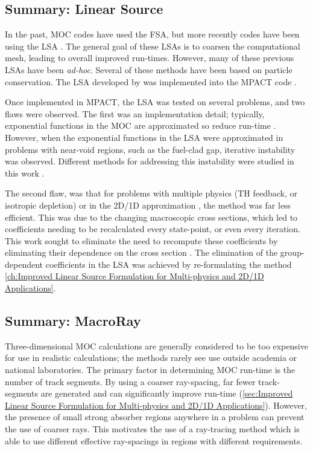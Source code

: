{{    \subsection{Summary: Linear Source}{\label{ssec:Summary:Linear Source}
      In the past, \acf{MOC} codes have used the \acf{FSA}, but more recently codes have been using the \acf{LSA} \cite{Halsall1993,Petkov1999,Santandrea2002,Tang2009,Rabiti2009,Hebert2016,Ferrer2016,Gunow2018}.
      The general goal of these \acp{LSA} is to coarsen the computational mesh, leading to overall improved run-times.
      However, many of these previous \acp{LSA} have been \emph{ad-hoc}.
      Several of these methods \cite{Santandrea2002,Hebert2016,Ferrer2016} have been based on particle conservation.
      The \ac{LSA} developed by \citet{Ferrer2016} was implemented into the MPACT code \cite{Fitzgerald2018,Fitzgerald2019}.

      Once implemented in MPACT, the \ac{LSA} was tested on several problems, and two flaws were observed.
      The first was an implementation detail; typically, exponential functions in the \ac{MOC} are approximated so reduce run-time \cite{Yamamoto2004}.
      However, when the exponential functions in the \ac{LSA} were approximated in problems with near-void regions, such as the fuel-clad gap, iterative instability was observed.
      Different methods for addressing this instability were studied in this work \cite{Fitzgerald2018}.

      The second flaw, was that for problems with multiple physics (\acf{TH} feedback, or isotropic depletion) or in the 2D/1D approximation \cite{Collins2016}, the method was far less efficient.
      This was due to the changing macroscopic cross sections, which led to coefficients needing to be recalculated every state-point, or even every iteration.
      This work sought to eliminate the need to recompute these coefficients by eliminating their dependence on the cross section \cite{Fitzgerald2019}.
      The elimination of the group-dependent coefficients in the \ac{LSA} was achieved by re-formulating the method \cref{ch:Improved Linear Source Formulation for Multi-physics and 2D/1D Applications}.
    }

    \subsection{Summary: MacroRay}{\label{ssec:Summary:MacroRay}
      Three-dimensional \ac{MOC} calculations are generally considered to be too expensive for use in realistic calculations; the methods rarely see use outside academia or national laboratories.
      The primary factor in determining \ac{MOC} run-time is the number of track segments.
      By using a coarser ray-spacing, far fewer track-segments are generated and can significantly improve run-time (\cref{sec:Improved Linear Source Formulation for Multi-physics and 2D/1D Applications}).
      However, the presence of small strong absorber regions anywhere in a problem can prevent the use of coarser rays.
      This motivates the use of a ray-tracing method which is able to use different effective ray-spacings in regions with different requirements.

}}}
